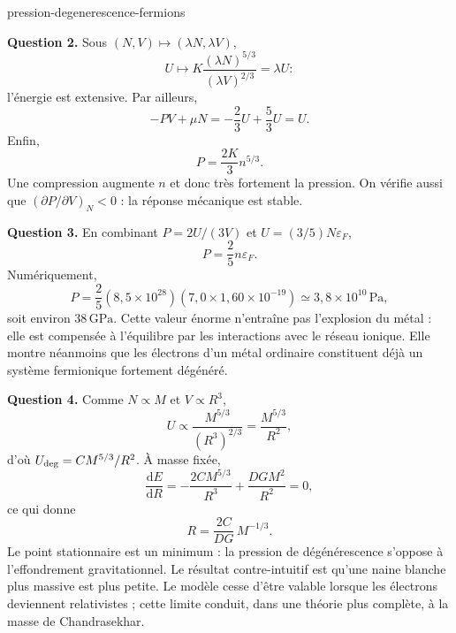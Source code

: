 \begin{exo}{pression-degenerescence-fermions}
\begin{solution}
\textbf{Question 2.} Sous $(N,V)\mapsto(\lambda N,\lambda V)$,
\[
U\mapsto K\frac{(\lambda N)^{5/3}}{(\lambda V)^{2/3}}=\lambda U :
\]
l'énergie est extensive. Par ailleurs,
\[
-PV+\mu N=-\frac23U+\frac53U=U.
\]
Enfin,
\[
\boxed{P=\frac{2K}{3}n^{5/3}.}
\]
Une compression augmente $n$ et donc très fortement la pression. On vérifie aussi que $(\partial P/\partial V)_N<0$ : la réponse mécanique est stable.

\textbf{Question 3.} En combinant $P=2U/(3V)$ et $U=(3/5)N\varepsilon_F$,
\[
P=\frac25n\varepsilon_F.
\]
Numériquement,
\[
P=\frac25(8{,}5\times10^{28})(7{,}0\times1{,}60\times10^{-19})
\simeq3{,}8\times10^{10}\,\mathrm{Pa},
\]
soit environ $38\,\mathrm{GPa}$. Cette valeur énorme n'entraîne pas l'explosion du métal : elle est compensée à l'équilibre par les interactions avec le réseau ionique. Elle montre néanmoins que les électrons d'un métal ordinaire constituent déjà un système fermionique fortement dégénéré.

\textbf{Question 4.} Comme $N\propto M$ et $V\propto R^3$,
\[
U\propto\frac{M^{5/3}}{(R^3)^{2/3}}=\frac{M^{5/3}}{R^2},
\]
d'où $U_{\rm deg}=CM^{5/3}/R^2$. À masse fixée,
\[
\frac{\mathrm dE}{\mathrm dR}
=-\frac{2CM^{5/3}}{R^3}+\frac{DGM^2}{R^2}=0,
\]
ce qui donne
\[
\boxed{R=\frac{2C}{DG}\,M^{-1/3}.}
\]
Le point stationnaire est un minimum : la pression de dégénérescence s'oppose à l'effondrement gravitationnel. Le résultat contre-intuitif est qu'une naine blanche plus massive est plus petite. Le modèle cesse d'être valable lorsque les électrons deviennent relativistes ; cette limite conduit, dans une théorie plus complète, à la masse de Chandrasekhar.
\end{solution}
\end{exo}
